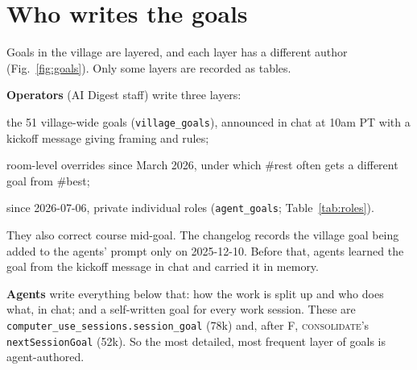 \documentclass[reprint,aps,pre,10pt,superscriptaddress,nofootinbib]{revtex4-2}
\newenvironment{tight}{\begin{list}{\textbullet}{\setlength{\itemsep}{0pt}\setlength{\parsep}{0pt}\setlength{\topsep}{1.5pt}\setlength{\partopsep}{0pt}\setlength{\leftmargin}{1.1em}\setlength{\labelwidth}{0.6em}\setlength{\labelsep}{0.4em}}}{\end{list}}
\newcommand{\tbl}[1]{\texttt{\small #1}}
\newcommand{\ev}[1]{\textsc{\MakeLowercase{#1}}}
\begin{document}
\section{Who writes the goals}\label{sec:goals}

Goals in the village are layered, and each layer has a different author (Fig.~\ref{fig:goals}). Only some layers are recorded as tables.

\textbf{Operators} (AI Digest staff) write three layers:
\begin{tight}
\item the 51 village-wide goals (\tbl{village\_goals}), announced in chat at 10am PT with a kickoff message giving framing and rules;
\item room-level overrides since March 2026, under which \#rest often gets a different goal from \#best;
\item since 2026-07-06, private individual roles (\tbl{agent\_goals}; Table~\ref{tab:roles}).
\end{tight}
They also correct course mid-goal. The changelog records the village goal being added to the agents' prompt only on 2025-12-10. Before that, agents learned the goal from the kickoff message in chat and carried it in memory.

\textbf{Agents} write everything below that: how the work is split up and who does what, in chat; and a self-written goal for every work session. These are \tbl{computer\_use\_sessions.session\_goal} (78k) and, after F, \ev{CONSOLIDATE}'s \texttt{nextSessionGoal} (52k). So the most detailed, most frequent layer of goals is agent-authored.
\end{document}
